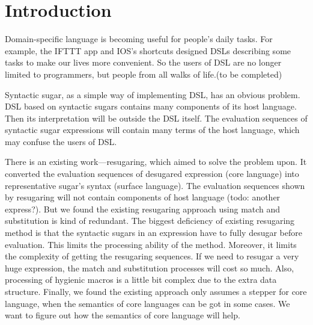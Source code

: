 \section{Introduction}







Domain-specific language\cite{dsl} is becoming useful for people's daily tasks. For example, the IFTTT app and IOS's shortcuts designed DSLs describing some tasks to make our lives more convenient. So the users of DSL are no longer limited to programmers, but people from all walks of life.(to be completed)

Syntactic sugar\cite{syntacticsugar}, as a simple way of implementing DSL, has an obvious problem. DSL based on syntactic sugars contains many components of its host language. Then its interpretation will be outside the DSL itself. The evaluation sequences of syntactic sugar expressions will contain many terms of the host language, which may confuse the users of DSL.

There is an existing work---resugaring\cite{resugaring}\cite{hygienic}, which aimed to solve the problem upon. It converted the evaluation sequences of desugared expression (core language) into representative sugar's syntax (surface language). The evaluation sequences shown by resugaring will not contain components of host language (todo: another express?). But we found the existing resugaring approach using match and substitution is kind of redundant. The biggest deficiency of existing resugaring method is that the syntactic sugars in an expression have to fully desugar before evaluation. This limits the processing ability of the method. Moreover, it limits the complexity of getting the resugaring sequences. If we need to resugar a very huge expression, the match and substitution processes will cost so much. Also, processing of hygienic macros is a little bit complex due to the extra data structure. Finally, we found the existing approach only assumes a stepper for core language, when the semantics of core languages can be got in some cases. We want to figure out how the semantics of core language will help.

